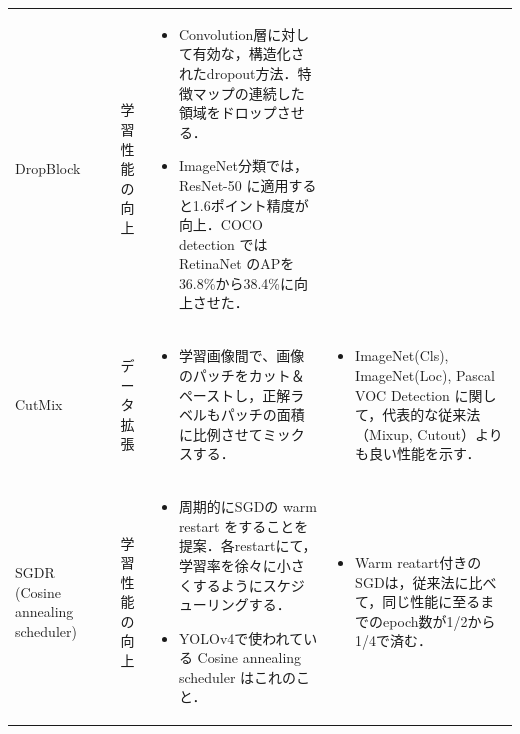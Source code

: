 \documentclass[originalpaper]{jsaiart}     %
\begin{document}
\begin{table}
\begin{center}
\begin{tabularx}{\linewidth}{Xp{1.5cm}Xp{7cm}X}
            DropBlock & \cite{GLL18} & 学習性能の向上 & 
            \begin{itemize}
                \vspace{-0.7\baselineskip}
                \setlength{\leftskip}{-3mm}
                \item Convolution層に対して有効な，構造化されたdropout方法．特徴マップの連続した領域をドロップさせる．
                \item ImageNet分類では，ResNet-50 に適用すると1.6ポイント精度が向上．COCO detection では RetinaNet のAPを36.8\%から38.4\%に向上させた．
            \end{itemize}
            &
            \\

            CutMix & \cite{YHCOYC19} & データ拡張 & 
            \begin{itemize}
                \vspace{-0.7\baselineskip}
                \setlength{\leftskip}{-3mm}
                \item 学習画像間で、画像のパッチをカット＆ペーストし，正解ラベルもパッチの面積に比例させてミックスする．
            \end{itemize}
            &
            \begin{itemize}
                \vspace{-0.7\baselineskip}
                \setlength{\leftskip}{-3mm}
                \item ImageNet(Cls), ImageNet(Loc), Pascal VOC Detection に関して，代表的な従来法（Mixup, Cutout）よりも良い性能を示す．
            \end{itemize}
            \\

            SGDR (Cosine annealing scheduler) & \cite{LoshHut17} & 学習性能の向上 & 
            \begin{itemize}
                \vspace{-0.7\baselineskip}
                \setlength{\leftskip}{-3mm}
                \item 周期的にSGDの warm restart をすることを提案．各restartにて，学習率を徐々に小さくするようにスケジューリングする．
                \item YOLOv4で使われている Cosine annealing scheduler はこれのこと．
            \end{itemize}
            &
            \begin{itemize}
                \vspace{-0.7\baselineskip}
                \setlength{\leftskip}{-3mm}
                \item Warm reatart付きのSGDは，従来法に比べて，同じ性能に至るまでのepoch数が1/2から1/4で済む．
            \end{itemize}
            \\


\end{tabularx}
\end{center}
\end{table}
\end{document}
